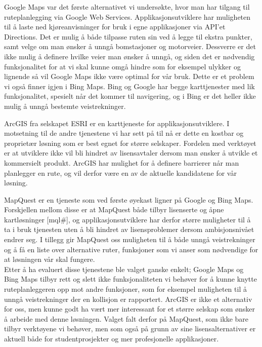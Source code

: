 \documentclass[a4paper,norsk,oneside]{book}
\begin{document}
Google Maps var det første alternativet vi undersøkte, hvor man har tilgang til ruteplanlegging via Google Web Services. Applikasjonsutviklere har muligheten til å laste ned kjøreanvisninger for bruk i egne applikasjoner via API’et Directions.\cite{directions} Det er mulig å både tilpasse ruten sin ved å legge til ekstra punkter, samt velge om man ønsker å unngå bomstasjoner og motorveier. Dessverre er det ikke mulig å definere hvilke veier man ønsker å unngå, og siden det er nødvendig funksjonalitet for at vi skal kunne omgå hindre som for eksempel ulykker og lignende så vil Google Maps ikke være optimal for vår bruk. Dette er et problem vi også finner igjen i Bing Maps\cite{bing}. Bing og Google har begge karttjenester med lik funksjonalitet, spesielt når det kommer til navigering, og i Bing er det heller ikke mulig å unngå bestemte veistrekninger.
	
ArcGIS fra selskapet ESRI er en karttjeneste for applikasjonsutviklere.\cite{arcgis} I motsetning til de andre tjenestene vi har sett på til nå er dette en kostbar og proprietær løsning som er best egnet for større selskaper. Fordelen med verktøyet er at utviklere ikke vil bli hindret av lisensavtaler dersom man ønsker å utvikle et kommersielt produkt. ArcGIS har mulighet for å definere barrierer når man planlegger en rute, og vil derfor være en av de aktuelle kandidatene for vår løsning.
	
MapQuest er en tjeneste som ved første øyekast ligner på Google og Bing Maps. Forskjellen mellom disse er at MapQuest både tilbyr lisenserte og åpne kartløsninger [mql\#], og applikasjonsutviklere har derfor større muligheter til å ta i bruk tjenesten uten å bli hindret av lisensproblemer dersom ambisjonsnivået endrer seg. I tillegg gir MapQuest oss muligheten til å både unngå veistrekninger og å få en liste over alternative ruter, funksjoner som vi anser som nødvendige for at løsningen vår skal fungere.\cite{altruter} \cite{unnga}\\

Etter å ha evaluert disse tjenestene ble valget ganske enkelt; Google Maps og Bing Maps tilbyr rett og slett ikke funksjonaliteten vi behøver for å kunne knytte ruteplanleggeren opp mot andre funksjoner, som for eksempel muligheten til å unngå veistrekninger der en kollisjon er rapportert. ArcGIS er ikke et alternativ for oss, men kunne godt ha vært mer interessant for et større selskap som ønsker å arbeide med denne løsningen. Valget falt derfor på MapQuest, som ikke bare tilbyr verktøyene vi behøver, men som også på grunn av sine lisensalternativer er aktuell både for studentprosjekter og mer profesjonelle applikasjoner.
\end{document}
